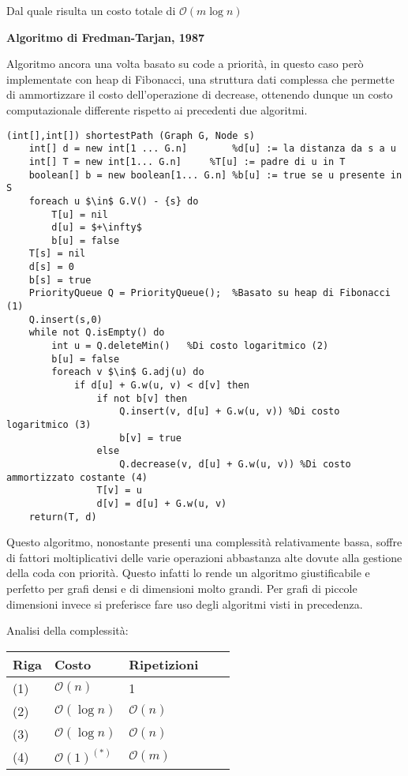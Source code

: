 \documentclass[../cheatSheetAlgoritmi.tex]{subfiles}
\begin{document}
\bigskip
Dal quale risulta un costo totale di $\mathcal{O}(m \log n)$
\newpage
\begin{flushleft}
\textbf{Algoritmo di Fredman-Tarjan, 1987}
\end{flushleft}
Algoritmo ancora una volta basato su code a priorità, in questo caso però implementate con heap di Fibonacci, una struttura dati complessa che permette di ammortizzare il costo dell'operazione di decrease, ottenendo dunque un costo computazionale differente rispetto ai precedenti due algoritmi.
\begin{lstlisting}[caption=Algoritmo di Fredman-Tarjan: cammini minimi a sorgente singola]
(int[],int[]) shortestPath (Graph G, Node s)
	int[] d = new int[1 ... G.n]		%d[u] := la distanza da s a u 
	int[] T = new int[1... G.n]		%T[u] := padre di u in T
	boolean[] b = new boolean[1... G.n]	%b[u] := true se u presente in S 
	foreach u $\in$ G.V() - {s} do
		T[u] = nil
		d[u] = $+\infty$
		b[u] = false
	T[s] = nil
	d[s] = 0
	b[s] = true
	PriorityQueue Q = PriorityQueue();	%Basato su heap di Fibonacci (1)
	Q.insert(s,0)
	while not Q.isEmpty() do 
		int u = Q.deleteMin()	%Di costo logaritmico (2)
		b[u] = false
		foreach v $\in$ G.adj(u) do
			if d[u] + G.w(u, v) < d[v] then 
				if not b[v] then
					Q.insert(v, d[u] + G.w(u, v)) %Di costo logaritmico (3)
					b[v] = true
				else
					Q.decrease(v, d[u] + G.w(u, v)) %Di costo ammortizzato costante (4)
				T[v] = u 
				d[v] = d[u] + G.w(u, v)
	return(T, d)
\end{lstlisting}
Questo algoritmo, nonostante presenti una complessità relativamente bassa, soffre di fattori moltiplicativi delle varie operazioni abbastanza alte dovute alla gestione della coda con priorità. Questo infatti lo rende un algoritmo giustificabile e perfetto per grafi densi e di dimensioni molto grandi. Per grafi di piccole dimensioni invece si preferisce fare uso degli algoritmi visti in precedenza.

\bigskip
Analisi della complessità:

\bigskip
\begin{tabular}{@{}lllll@{}}
\toprule
Riga & Costo & Ripetizioni &  &  \\ \midrule
(1) & $\mathcal{O}(n)$     & 1           &  &  \\
(2)    & $\mathcal{O}(\log n)$     & $\mathcal{O}(n)$           &  &  \\
(3)    & $\mathcal{O}(\log n)$     & $\mathcal{O}(n)$           &  &  \\
(4)    & $\mathcal{O}(1)^{(*)}$     & $\mathcal{O}(m)$           &  &  \\ \bottomrule
\end{tabular}
\end{document}
